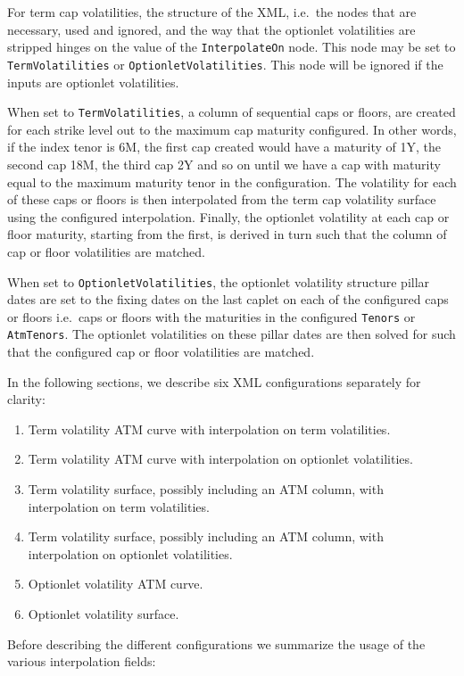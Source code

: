 For term cap volatilities, the structure of the XML, i.e.\ the nodes that are necessary, used and ignored, and the way that the optionlet volatilities are stripped hinges on the value of the \lstinline!InterpolateOn! node. This node may be set to \lstinline!TermVolatilities! or \lstinline!OptionletVolatilities!. This node will be ignored if the inputs are optionlet volatilities.

When set to \lstinline!TermVolatilities!, a column of sequential caps or floors, are created for each strike level out to the maximum cap maturity configured. In other words, if the index tenor is 6M, the first cap created would have a maturity of 1Y, the second cap 18M, the third cap 2Y and so on until we have a cap with maturity equal to the maximum maturity tenor in the configuration. The volatility for each of these caps or floors is then interpolated from the term cap volatility surface using the configured interpolation. Finally, the optionlet volatility at each cap or floor maturity, starting from the first, is derived in turn such that the column of cap or floor volatilities are matched.

When set to \lstinline!OptionletVolatilities!, the optionlet volatility structure pillar dates are set to the fixing dates on the last caplet on each of the configured caps or floors i.e.\ caps or floors with the maturities in the configured \lstinline!Tenors! or \lstinline!AtmTenors!. The optionlet volatilities on these pillar dates are then solved for such that the configured cap or floor volatilities are matched.

In the following sections, we describe six XML configurations separately for clarity:

\begin{enumerate}
\item Term volatility ATM curve with interpolation on term volatilities.
\item Term volatility ATM curve with interpolation on optionlet volatilities.
\item Term volatility surface, possibly including an ATM column, with interpolation on term volatilities.
\item Term volatility surface, possibly including an ATM column, with interpolation on optionlet volatilities.
\item Optionlet volatility ATM curve.
\item Optionlet volatility surface.
\end{enumerate}

Before describing the different configurations we summarize the usage of the various interpolation fields:

